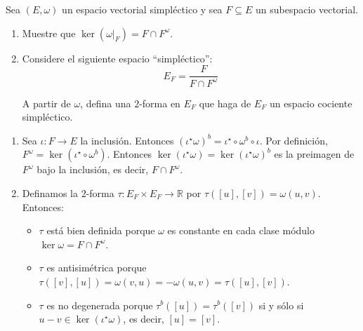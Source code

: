 \begin{problem}
Sea $(E, \omega)$ un espacio vectorial simpléctico y sea $F \subseteq E$ un subespacio vectorial.

\begin{enumerate}
    \item Muestre que $\ker (\omega|_F) = F \cap F^\omega$.
    
    \item Considere el siguiente espacio ``simpléctico'':
    $$E_F = \frac F {F \cap F^\omega}$$
    
    A partir de $\omega$, defina una $2$-forma en $E_F$ que haga de $E_F$ un espacio cociente simpléctico.
\end{enumerate}
\end{problem}

\begin{solution}
\leavevmode
\begin{enumerate}
    \item Sea $\iota : F \to E$ la inclusión. Entonces $(\iota^\star \omega)^b = \iota^\star \circ \omega^b \circ \iota$. Por definición, $F^\omega = \ker (\iota^\star \circ \omega^b)$. Entonces $\ker (\iota^\star \omega) = \ker (\iota^\star \omega)^b$ es la preimagen de $F^\omega$ bajo la inclusión, es decir, $F \cap F^\omega$.
    
    \item Definamos la $2$-forma $\tau : E_F \times E_F \to \mathbb R$ por $\tau([u], [v]) = \omega(u, v)$. Entonces:
    \begin{itemize}
        \item $\tau$ está bien definida porque $\omega$ es constante en cada clase módulo $\ker \omega = F \cap F^\omega$.
        \item $\tau$ es antisimétrica porque $\tau([v], [u]) = \omega(v, u) = -\omega(u, v) = \tau([u], [v])$.
        \item $\tau$ es no degenerada porque $\tau^b([u]) = \tau^b([v])$ si y sólo si $u - v \in \ker (\iota^\star \omega)$, es decir, $[u] = [v]$.
    \end{itemize}
\end{enumerate}
\end{solution}
